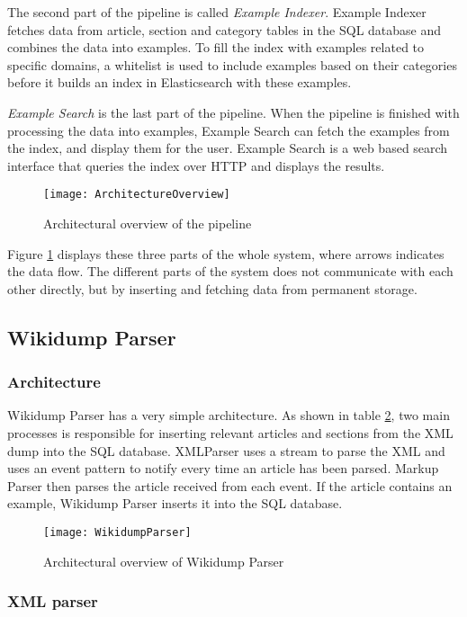 The second part of the pipeline is called \textit{Example Indexer}. Example Indexer fetches data from article, section and category tables in the SQL database and combines the data into examples. To fill the index with examples related to specific domains, a whitelist is used to include examples based on their categories before it builds an index in Elasticsearch with these examples.

\textit{Example Search} is the last part of the pipeline. When the pipeline is finished with processing the data into examples, Example Search can fetch the examples from the index, and display them for the user. Example Search is a web based search interface that queries the index over HTTP and displays the results.

\begin{figure}[H]
\caption{Architectural overview of the pipeline}
\texttt{[image: ArchitectureOverview]}
\label{fig:pipeline_arch}
\end{figure}

Figure \ref{fig:pipeline_arch} displays these three parts of the whole system, where arrows indicates the data flow. The different parts of the system does not communicate with each other directly, but by inserting and fetching data from permanent storage. 


\subsection{Wikidump Parser}

\subsubsection{Architecture}
Wikidump Parser has a very simple architecture. As shown in table \ref{fig:wikidump_parser}, two main processes is responsible for inserting relevant articles and sections from the XML dump into the SQL database. XMLParser uses a stream to parse the XML and uses an event pattern to notify every time an article has been parsed. Markup Parser then parses the article received from each event. If the article contains an example, Wikidump Parser inserts it into the SQL database.

\begin{figure}[h]
\caption{Architectural overview of Wikidump Parser}
\texttt{[image: WikidumpParser]}
\label{fig:wikidump_parser}
\end{figure}

\subsubsection{XML parser}

